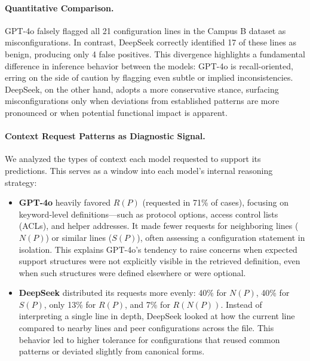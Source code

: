 \paragraph{Quantitative Comparison.}
GPT-4o falsely flagged all 21 configuration lines in the Campus B dataset as misconfigurations. In contrast, DeepSeek correctly identified 17 of these lines as benign, producing only 4 false positives. This divergence highlights a fundamental difference in inference behavior between the models: GPT-4o is recall-oriented, erring on the side of caution by flagging even subtle or implied inconsistencies. DeepSeek, on the other hand, adopts a more conservative stance, surfacing misconfigurations only when deviations from established patterns are more pronounced or when potential functional impact is apparent. 

\paragraph{Context Request Patterns as Diagnostic Signal.}
We analyzed the types of context each model requested to support its predictions. This serves as a window into each model’s internal reasoning strategy:

\begin{itemize}
    \item \textbf{GPT-4o} heavily favored $R(P)$ (requested in 71\% of cases), focusing on keyword-level definitions—such as protocol options, access control lists (ACLs), and helper addresses. It made fewer requests for neighboring lines ($N(P)$) or similar lines ($S(P)$), often assessing a configuration statement in isolation. This explains GPT-4o’s tendency to raise concerns when expected support structures were not explicitly visible in the retrieved definition, even when such structures were defined elsewhere or were optional.

    \item \textbf{DeepSeek} distributed its requests more evenly: 40\% for $N(P)$, 40\% for $S(P)$, only 13\% for $R(P)$, and 7\% for $R(N(P))$. Instead of interpreting a single line in depth, DeepSeek looked at how the current line compared to nearby lines and peer configurations across the file. This behavior led to higher tolerance for configurations that reused common patterns or deviated slightly from canonical forms.
\end{itemize}

